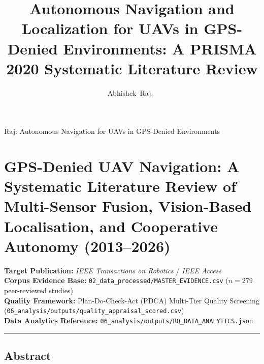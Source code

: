 \documentclass[journal]{IEEEtran}
\begin{document}
\title{Autonomous Navigation and Localization for UAVs in GPS-Denied Environments: A PRISMA 2020 Systematic Literature Review}

\author{Abhishek~Raj,~}

%
{Raj: Autonomous Navigation for UAVs in GPS-Denied Environments}

\maketitle

\section{GPS-Denied UAV Navigation: A Systematic Literature Review of
Multi-Sensor Fusion, Vision-Based Localisation, and Cooperative Autonomy
(2013--2026)}\label{gps-denied-uav-navigation-a-systematic-literature-review-of-multi-sensor-fusion-vision-based-localisation-and-cooperative-autonomy-20132026}

\textbf{Target Publication:} \emph{IEEE Transactions on Robotics} /
\emph{IEEE Access}\\
\textbf{Corpus Evidence Base:}
\texttt{02\_data\_processed/MASTER\_EVIDENCE.csv} (\(n = 279\)
peer-reviewed studies)\\
\textbf{Quality Framework:} Plan-Do-Check-Act (PDCA) Multi-Tier Quality
Screening
(\texttt{06\_analysis/outputs/quality\_appraisal\_scored.csv})\\
\textbf{Data Analytics Reference:}
\texttt{06\_analysis/outputs/RQ\_DATA\_ANALYTICS.json}

\begin{center}\rule{0.5\linewidth}{0.5pt}\end{center}

\subsection{Abstract}\label{abstract}
\end{document}
